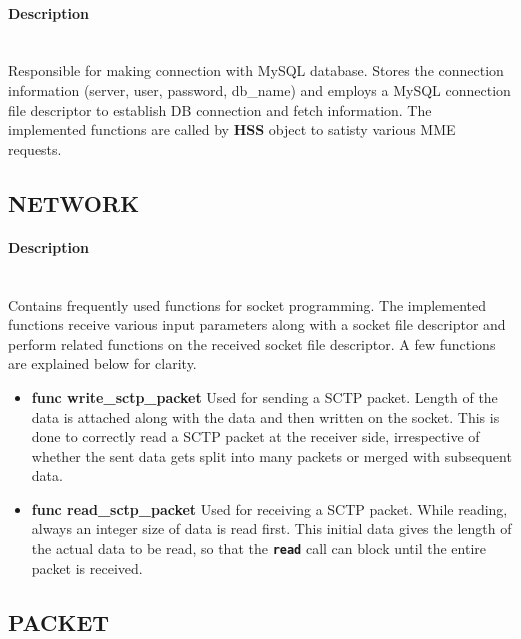 \documentclass[hidelinks]{report}
\newcommand{\cf}[1] {
	\textbf{\texttt{#1}}
}
\begin{document}
\paragraph*{Description}

~\\ Responsible for making connection with MySQL database. Stores the connection information (server, user, password, db\_name) and employs a MySQL connection file descriptor to establish DB connection and fetch information. The implemented functions are called by \textbf{HSS} object to satisty various MME requests.

\subsection*{NETWORK}

\paragraph*{Description}

~\\ Contains frequently used functions for socket programming. The implemented functions receive various input parameters along with a socket file descriptor and perform related functions on the received socket file descriptor. A few functions are explained below for clarity.

\begin{itemize}

\item \textbf{func write\_sctp\_packet} Used for sending a SCTP packet. Length of the data is attached along with the data and then written on the socket. This is done to correctly read a SCTP packet at the receiver side, irrespective of whether the sent data gets split into many packets or merged with subsequent data.

\item \textbf{func read\_sctp\_packet} Used for receiving a SCTP packet. While reading, always an integer size of data is read first. This initial data gives the length of the actual data to be read, so that the \cf{read} call can block until the entire packet is received.

\end{itemize}

\subsection*{PACKET}
\end{document}
